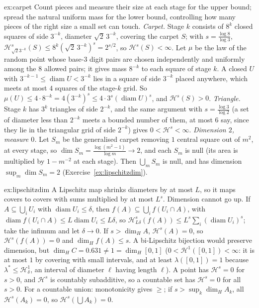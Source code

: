 \begin{solution}{ex:carpet}
\idea Count pieces and measure their size at each stage for the upper bound; spread the natural uniform mass for the lower bound, controlling how many pieces of the right size a small set can touch.
\writeup \emph{Carpet.} Stage $k$ consists of $8^k$ closed squares of side $3^{-k}$, diameter $\sqrt2\,3^{-k}$, covering the carpet $S$; with $s=\frac{\log8}{\log3}$, $\mathcal H^s_{\sqrt23^{-k}}(S)\le8^k(\sqrt2\,3^{-k})^s=2^{s/2}$, so $\mathcal H^s(S)<\infty$.
Let $\mu$ be the law of the random point whose base-$3$ digit pairs are chosen independently and uniformly among the $8$ allowed pairs; it gives mass $8^{-k}$ to each square of stage $k$. A closed $U$ with
$3^{-k-1}\le\operatorname{diam}U<3^{-k}$ lies in a square of side $3^{-k}$ placed anywhere, which meets at most $4$ squares of the stage-$k$ grid. So $\mu(U)\le4\cdot8^{-k}=4(3^{-k})^s\le4\cdot3^s(\operatorname{diam}U)^s$, and
$\mathcal H^s(S)>0$. \emph{Triangle.} Stage $k$ has $3^k$ triangles of side $2^{-k}$, and the same argument with $s=\frac{\log3}{\log2}$ (a set of diameter less than $2^{-k}$ meets a bounded number of them, at most $6$ say,
since they lie in the triangular grid of side $2^{-k}$) gives $0<\mathcal H^s<\infty$. \emph{Dimension $2$, measure $0$.} Let $S_m$ be the generalised carpet removing $1$ central square out of $m^2$, at every stage, so
$\dim S_m=\frac{\log(m^2-1)}{\log m}\to2$, and each $S_m$ is null (its area is multiplied by $1-m^{-2}$ at each stage). Then $\bigcup_mS_m$ is null, and has dimension $\sup_m\dim S_m=2$ (Exercise~\ref{ex:lipschitzdim}).
\end{solution}

\begin{solution}{ex:lipschitzdim}
\idea A Lipschitz map shrinks diameters by at most $L$, so it maps covers to covers with sums multiplied by at most $L^s$. Dimension cannot go up.
\writeup If $A\subseteq\bigcup_iU_i$ with $\operatorname{diam}U_i\le\delta$, then $f(A)\subseteq\bigcup_if(U_i\cap A)$, with $\operatorname{diam}f(U_i\cap A)\le L\operatorname{diam}U_i\le L\delta$, so $\mathcal H^s_{L\delta}(f(A))\le L^s\sum_i(\operatorname{diam}U_i)^s$; take the
infimum and let $\delta\to0$. If $s>\dim_HA$, $\mathcal H^s(A)=0$, so $\mathcal H^s(f(A))=0$ and $\dim_Hf(A)\le s$. A bi-Lipschitz bijection would preserve dimension, but $\dim_HC=0.631\ne1=\dim_H[0,1]$ ($0<\mathcal H^1([0,1])<\infty$: it is
at most $1$ by covering with small intervals, and at least $\lambda([0,1])=1$ because $\lambda^*\le\mathcal H^1_\delta$, an interval of diameter $\ell$ having length $\ell$). A point has $\mathcal H^s=0$ for $s>0$, and $\mathcal H^s$ is countably
subadditive, so a countable set has $\mathcal H^s=0$ for all $s>0$. For a countable union: monotonicity gives $\ge$; if $s>\sup_k\dim_HA_k$, all $\mathcal H^s(A_k)=0$, so $\mathcal H^s(\bigcup A_k)=0$.
\end{solution}


